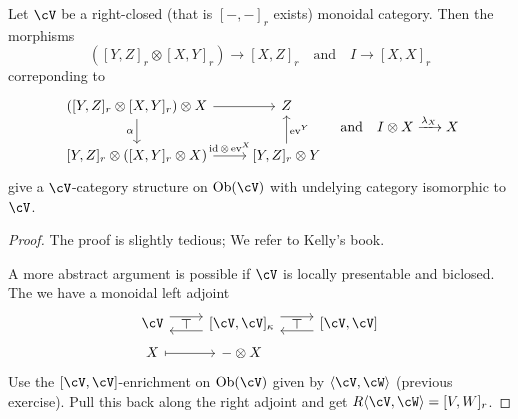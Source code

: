 \documentclass[a4paper,11pt,oneside,openany]{scrbook}
\begin{document}
\begin{prop}
    Let $ \cV $ be a right-closed (that is $ [-,-]_r $ exists) monoidal category.
    Then the morphisms
    \begin{displaymath}
	([Y,Z]_r \otimes [X,Y]_r ) \to [X,Z]_r \quad \text{and} \quad I \to [X,X]_r
    \end{displaymath}
    correponding to
    \begin{displaymath}
	\begin{tikzcd}
	([Y,Z]_r \otimes [X,Y]_r) \otimes X \arrow[r]\arrow[d, "\alpha"'] & Z \\
	\lbrack Y,Z\rbrack_r \otimes ([X,Y]_r \otimes X) \arrow[r, "\id\otimes \ev^X"]  & \lbrack Y,Z\rbrack_r\otimes Y \arrow[u, "\ev^Y"']
    \end{tikzcd}\quad \text{and}\quad
    I\otimes X \xrightarrow{\lambda_X} X
    \end{displaymath}
    give a $ \cV $-category structure on $ \Ob(\cV) $ with undelying category isomorphic to $ \cV $.
\end{prop}
\begin{proof}
    The proof is slightly tedious; We refer to Kelly's book.

    A more abstract argument is possible if $ \cV $ is locally presentable and biclosed.
    The we have a monoidal left adjoint
    \begin{displaymath}
	\begin{tikzcd}[row sep = tiny]
	    \cV
	    \arrow[r, shift left=.5em] \arrow[from=r, shift left=.5em] \arrow[r,phantom, "\top"]
	    & \lbrack \cV,\cV\rbrack_{\kappa}
	    \arrow[r, shift left=.5em]
	    \arrow[from=r, shift left=.5em]
	    \arrow[r,phantom, "\top"]
	    & \lbrack \cV ,\cV \rbrack\\
	    X \arrow[mapsto, r] & -\otimes X
        \end{tikzcd}
    \end{displaymath}
    Use the $ [\cV,\cV] $-enrichment on $ \Ob(\cV) $ given by $ \langle\cV,\cW\rangle $ (previous exercise).
    Pull this back along the right adjoint and get $ R\langle \cV,\cW\rangle = [V,W]_r $.
\end{proof}
\end{document}
